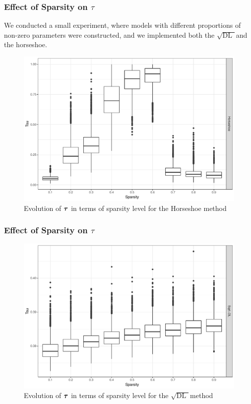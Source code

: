 \documentclass[10pt]{beamer}
\theoremstyle{plain}
\def\sqdl{$\sqrt{\text{DL }}$}
\begin{document}
\begin{frame}
\frametitle{Effect of Sparsity on $\tau$}
We conducted a small experiment, where models with different proportions of non-zero parameters were constructed, and we implemented both the \sqdl and the horseshoe.
\begin{figure}
\centering
\includegraphics[width = .9\columnwidth , height = .7\textheight]{Tau_hs}\caption{Evolution of $\boldsymbol{\tau}$ in terms of sparsity level for the Horseshoe method}\label{fig:tau-hs}
\end{figure}
\end{frame}

\begin{frame}
\frametitle{Effect of Sparsity on $\tau$}
\begin{figure}
\centering
\includegraphics[width = .9\columnwidth , height = .7\textheight]{Tau_dl}\caption{Evolution of $\boldsymbol{\tau}$ in terms of sparsity level for the \sqdl method}\label{fig:tau-dl}
\end{figure}
\end{frame}
\end{document}
